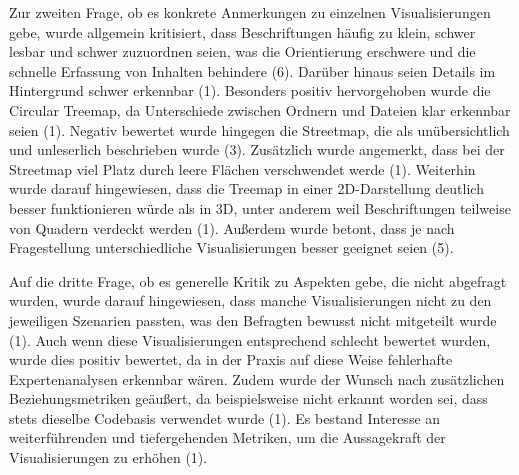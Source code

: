Zur zweiten Frage, ob es konkrete Anmerkungen zu einzelnen Visualisierungen gebe, wurde allgemein kritisiert, dass Beschriftungen häufig zu klein, schwer lesbar und schwer zuzuordnen seien, was die Orientierung erschwere und die schnelle Erfassung von Inhalten behindere (6). Darüber hinaus seien Details im Hintergrund schwer erkennbar (1). Besonders positiv hervorgehoben wurde die Circular Treemap, da Unterschiede zwischen Ordnern und Dateien klar erkennbar seien (1). Negativ bewertet wurde hingegen die Streetmap, die als unübersichtlich und unleserlich beschrieben wurde (3). Zusätzlich wurde angemerkt, dass bei der Streetmap viel Platz durch leere Flächen verschwendet werde (1). Weiterhin wurde darauf hingewiesen, dass die Treemap in einer 2D-Darstellung deutlich besser funktionieren würde als in 3D, unter anderem weil Beschriftungen teilweise von Quadern verdeckt werden (1). Außerdem wurde betont, dass je nach Fragestellung unterschiedliche Visualisierungen besser geeignet seien (5).

Auf die dritte Frage, ob es generelle Kritik zu Aspekten gebe, die nicht abgefragt wurden, wurde darauf hingewiesen, dass manche Visualisierungen nicht zu den jeweiligen Szenarien passten, was den Befragten bewusst nicht mitgeteilt wurde (1). Auch wenn diese Visualisierungen entsprechend schlecht bewertet wurden, wurde dies positiv bewertet, da in der Praxis auf diese Weise fehlerhafte Expertenanalysen erkennbar wären. Zudem wurde der Wunsch nach zusätzlichen Beziehungsmetriken geäußert, da beispielsweise nicht erkannt worden sei, dass stets dieselbe Codebasis verwendet wurde (1). Es bestand Interesse an weiterführenden und tiefergehenden Metriken, um die Aussagekraft der Visualisierungen zu erhöhen (1).